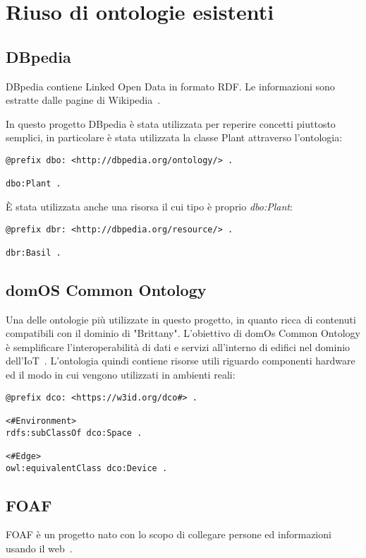 \section{Riuso di ontologie esistenti}
\subsection{DBpedia}
DBpedia contiene Linked Open Data in formato RDF. Le informazioni sono estratte dalle pagine di Wikipedia~\cite{wwwdbped0:online}.

\noindent In questo progetto DBpedia è stata utilizzata per reperire concetti piuttosto semplici, in particolare è stata utilizzata la classe Plant attraverso l'ontologia:
\begin{verbatim}
@prefix dbo: <http://dbpedia.org/ontology/> .

dbo:Plant .
\end{verbatim}
È stata utilizzata anche una risorsa il cui tipo è proprio \textit{dbo:Plant}:
\begin{verbatim}
@prefix dbr: <http://dbpedia.org/resource/> .

dbr:Basil .
\end{verbatim}

\subsection{domOS Common Ontology}
Una delle ontologie più utilizzate in questo progetto, in quanto ricca di contenuti compatibili con il dominio di "Brittany".
L'obiettivo di domOs Common Ontology è semplificare l'interoperabilità di dati e servizi all'interno di edifici nel dominio dell'IoT~\cite{domOSCom57:online}. L'ontologia quindi contiene risorse utili riguardo componenti hardware ed il modo in cui vengono utilizzati in ambienti reali:

\begin{verbatim}
@prefix dco: <https://w3id.org/dco#> .

<#Environment>
rdfs:subClassOf dco:Space .

<#Edge>
owl:equivalentClass dco:Device .
\end{verbatim}

\subsection{FOAF}
FOAF è un progetto nato con lo scopo di collegare persone ed informazioni usando il web~\cite{FOAFVoca16:online}.

